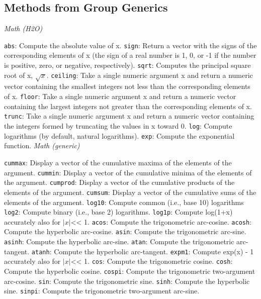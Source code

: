 {{{\subsection{Methods from Group Generics}
\medskip
{\emph{Math (H2O)}}\par
{\texttt{abs}}: Compute the absolute value of x.  
{\texttt{sign}}: Return a vector with the signs of the corresponding elements of x (the sign of a real number is 1, 0, or -1 if the number is positive, zero, or negative, respectively).  
{\texttt{sqrt}}: Computes the principal square root of x, $\sqrt{x}$. 
{\texttt{ceiling}}: Take a single numeric argument x and return a numeric vector containing the smallest integers not less than the corresponding elements of x.  
{\texttt{floor}}: Take a single numeric argument x and return a numeric vector containing the largest integers not greater than the corresponding elements of x.  
{\texttt{trunc}}: Take a single numeric argument x and return a numeric vector containing the integers formed by truncating the values in x toward 0.  
{\texttt{log}}: Compute logarithms (by default, natural logarithms).  
{\texttt{exp}}: Compute the exponential function. 
\medskip
{\emph{Math (generic)}}\par
{\texttt{cummax}}: Display a vector of the cumulative maxima of the elements of the argument. 
{\texttt{cummin}}: Display a vector of the cumulative minima of the elements of the argument. 
{\texttt{cumprod}}: Display a vector of the cumulative products of the elements of the argument.  
{\texttt{cumsum}}: Display a vector of the cumulative sums of the elements of the argument.   
{\texttt{log10}}: Compute common (i.e., base 10) logarithms  
{\texttt{log2}}: Compute binary (i.e., base 2) logarithms.  
{\texttt{log1p}}: Compute log(1+x) accurately also for $|x|${}\textless{}\textless{} 1. 
{\texttt{acos}}: Compute the trigonometric arc-cosine.  
{\texttt{acosh}}: Compute the hyperbolic arc-cosine.  
{\texttt{asin}}: Compute the trigonometric arc-sine. 
{\texttt{asinh}}: Compute the hyperbolic arc-sine. 
{\texttt{atan}}: Compute the trigonometric arc-tangent.  
{\texttt{atanh}}: Compute the hyperbolic arc-tangent. 
{\texttt{expm1}}: Compute exp(x) - 1 accurately also for $|x|$\textless{}\textless{} 1. 
{\texttt{cos}}: Compute the trigonometric cosine. 
{\texttt{cosh}}: Compute the hyperbolic cosine.  
{\texttt{cospi}}: Compute the trigonometric two-argument arc-cosine.  
{\texttt{sin}}: Compute the trigonometric sine.  
{\texttt{sinh}}: Compute the hyperbolic sine.  
{\texttt{sinpi}}: Compute the trigonometric two-argument arc-sine.  
}}}
